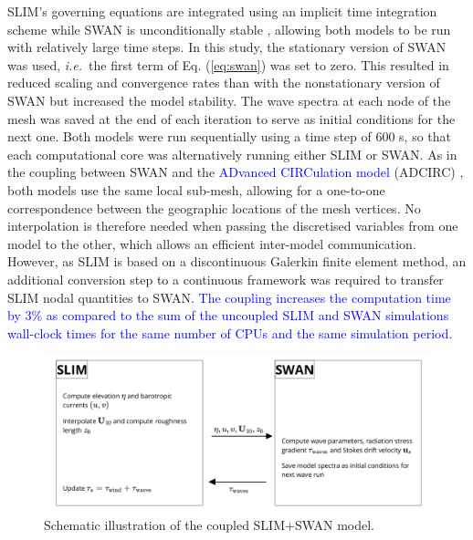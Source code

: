 \documentclass[preprint,12pt,authoryear]{elsarticle}
\newcommand{\ie}{{\it i.e.}\ }
\newcommand{\modif}[1]{\textcolor{blue}{#1}}
\begin{document}
SLIM's governing equations are integrated using an implicit time integration scheme while SWAN is unconditionally stable \citep{dietrich2012performance}, allowing both models to be run with relatively large time steps. In this study, the stationary version of SWAN was used, \ie the first term of Eq. (\ref{eq:swan}) was set to zero. This resulted in reduced scaling and convergence rates than with the nonstationary version of SWAN but increased the model stability. The wave spectra at each node of the mesh was saved at the end of each iteration to serve as initial conditions for the next one. Both models were run sequentially using a time step of 600 s, so that each computational core was alternatively running either SLIM or SWAN. As in the coupling between SWAN and the \modif{ADvanced CIRCulation model} (ADCIRC) \citep{dietrich2012performance}, both models use the same local sub-mesh, allowing for a one-to-one correspondence between the geographic locations of the mesh vertices. No interpolation is therefore needed when passing the discretised variables from one model to the other, which allows an efficient inter-model communication. However, as SLIM is based on  a discontinuous Galerkin finite element method, an additional conversion step to a continuous framework was required to transfer SLIM nodal quantities to SWAN. \modif{The coupling increases the computation time by 3\% as compared to the sum of the uncoupled SLIM and SWAN simulations wall-clock times for the same number of CPUs and the same simulation period.}


\begin{figure}
    \centering
    \includegraphics[width=.99\textwidth]{coupling_v2.png}
    \caption{Schematic illustration of the coupled SLIM+SWAN model.}
    \label{fig:coupling}
\end{figure}
\end{document}
